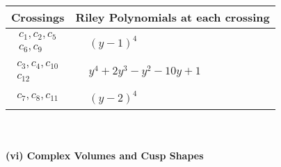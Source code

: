 \documentclass[1p]{elsarticle_modified}
\theoremstyle{definition}
\begin{document}
\begin{tabular}{m{50pt}|m{274pt}}
Crossings & \hspace{64pt}Riley Polynomials at each crossing \\
\hline $$\begin{aligned}c_{1},c_{2},c_{5}\\c_{6},c_{9}\end{aligned}$$&$\begin{aligned}
&(y-1)^4
\end{aligned}$\\
\hline $$\begin{aligned}c_{3},c_{4},c_{10}\\c_{12}\end{aligned}$$&$\begin{aligned}
&y^4+2 y^3- y^2-10 y+1
\end{aligned}$\\
\hline $$\begin{aligned}c_{7},c_{8},c_{11}\end{aligned}$$&$\begin{aligned}
&(y-2)^4
\end{aligned}$\\
\hline
\end{tabular}\\~\\
\newpage\flushleft \textbf{(vi) Complex Volumes and Cusp Shapes}
\end{document}
